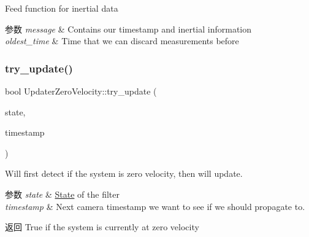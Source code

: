 Feed function for inertial data 


\begin{DoxyParams}{参数}
{\em message} & Contains our timestamp and inertial information \\
\hline
{\em oldest\+\_\+time} & Time that we can discard measurements before \\
\hline
\end{DoxyParams}
\mbox{\label{classov__msckf_1_1UpdaterZeroVelocity_a703a198829da68f905280ce8af8aa9e6}} 
\subsubsection{\texorpdfstring{try\+\_\+update()}{try\_update()}}
{\footnotesize\ttfamily bool Updater\+Zero\+Velocity\+::try\+\_\+update (\begin{DoxyParamCaption}\item[{std\+::shared\+\_\+ptr$<$ \hyperlink{classov__msckf_1_1State}{State} $>$}]{state,  }\item[{double}]{timestamp }\end{DoxyParamCaption})}



Will first detect if the system is zero velocity, then will update. 


\begin{DoxyParams}{参数}
{\em state} & \hyperlink{classov__msckf_1_1State}{State} of the filter \\
\hline
{\em timestamp} & Next camera timestamp we want to see if we should propagate to. \\
\hline
\end{DoxyParams}
\begin{DoxyReturn}{返回}
True if the system is currently at zero velocity 
\end{DoxyReturn}
